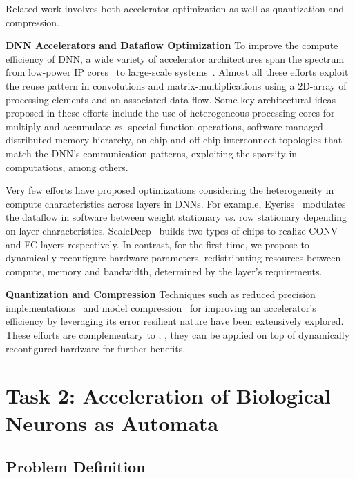 Related work involves both accelerator optimization as well as quantization and compression.

\textbf{DNN Accelerators and Dataflow Optimization}
To improve the compute efficiency of DNN, a wide variety of accelerator architectures span the spectrum from low-power IP cores~\cite{du2015shidiannao,chen2017eyeriss,chakradhar2010dynamically,albericio2016cnvlutin,han2016eie,reagen2016minerva,eldridge2015towards} to large-scale systems~\cite{venkataramani2017scaledeep,jouppi2017datacenter,chen2014dadiannao}.
Almost all these efforts exploit the reuse pattern in convolutions and matrix-multiplications using a 2D-array of processing elements and an associated data-flow.
Some key architectural ideas proposed in these efforts include the use of heterogeneous processing cores for multiply-and-accumulate \emph{vs.} special-function operations, software-managed distributed memory hierarchy, on-chip and off-chip interconnect topologies that match the DNN's communication patterns, exploiting the sparsity in computations, among others.

Very few efforts have proposed optimizations considering the heterogeneity in compute characteristics across layers in DNNs.
For example, Eyeriss~\cite{chen2017eyeriss} modulates the dataflow in software between weight stationary \emph{vs.} row stationary depending on layer characteristics.
ScaleDeep~\cite{venkataramani2017scaledeep} builds two types of chips to realize CONV and FC layers respectively.
In contrast, for the first time, we propose to dynamically reconfigure hardware parameters, redistributing resources between compute, memory and bandwidth, determined by the layer's requirements.

\textbf{Quantization and Compression}
Techniques such as  reduced precision implementations~\cite{reagen2016minerva} and model compression~\cite{han2016eie} for improving an accelerator's efficiency by leveraging its error resilient nature have been extensively explored.
These efforts are complementary to \dyhardDnns, \ie, they can be applied on top of dynamically reconfigured hardware for further benefits.

\section{Task 2: Acceleration of Biological Neurons as Automata}

\subsection{Problem Definition}

